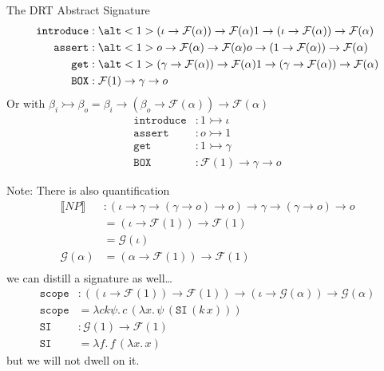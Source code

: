 \documentclass{beamer}
\newcommand{\sem}[1]{\llbracket #1 \rrbracket}
\newcommand{\lam}[2]{\lambda #1.\, #2}
\newcommand{\ap}[2]{#1\,#2}
\newcommand{\op}[1]{\mathtt{#1}}
\newcommand{\FF}{\mathcal{F}}
\newcommand{\GG}{\mathcal{G}}
\newcommand{\boxop}{\texttt{BOX}}
\newcommand{\scope}{\texttt{scope}}
\newcommand{\siop}{\texttt{SI}}
\begin{document}
\begin{frame}{The DRT Abstract Signature}
  \begin{align*}
    \op{introduce} &: \alt<1>{(\iota \to \FF(\alpha)) \to \FF(\alpha)}
                             {1 \to (\iota \to \FF(\alpha)) \to \FF(\alpha)} \\
    \op{assert} &: \alt<1>{o \to \FF(\alpha) \to \FF(\alpha)}
                          {o \to (1 \to \FF(\alpha)) \to \FF(\alpha)} \\
    \op{get} &: \alt<1>{(\gamma \to \FF(\alpha)) \to \FF(\alpha)}
                       {1 \to (\gamma \to \FF(\alpha)) \to \FF(\alpha)}\\
    \boxop &: \FF(1) \to \gamma \to o
  \end{align*}
  \pause \pause \vfill Or with $\beta_i \rightarrowtail \beta_o = \beta_i
  \to (\beta_o \to \FF(\alpha)) \to \FF(\alpha)$
  \begin{align*}
    \op{introduce} &: 1 \rightarrowtail \iota \\
    \op{assert} &: o \rightarrowtail 1 \\
    \op{get} &: 1 \rightarrowtail \gamma \\
    \boxop &: \FF(1) \to \gamma \to o
  \end{align*}
\end{frame}

\begin{frame}{Note: There is also quantification}
  \begin{align*}
    \sem{NP} &: (\iota \to \gamma \to (\gamma \to o) \to o) \to \gamma \to (\gamma \to o) \to o \\
    &= (\iota \to \FF(1)) \to \FF(1) \\
    &= \GG(\iota) \\
    \GG(\alpha) &= (\alpha \to \FF(1)) \to \FF(1) \\
  \end{align*}
  \pause
  we can distill a signature as well\ldots
  \begin{align*}
    \scope &: ((\iota \to \FF(1)) \to \FF(1)) \to (\iota \to \GG(\alpha)) \to \GG(\alpha) \\
    \scope &= \lam{c k \psi}{\ap{c}{(\lam{x}{\ap{\psi}{(\ap{\siop}{(\ap{k}{x})})}})}} \\
    \siop &: \GG(1) \to \FF(1) \\
    \siop &= \lam{f}{\ap{f}{(\lam{x}{x})}}
  \end{align*}
  \pause
  but we will not dwell on it.
\end{frame}
\end{document}
